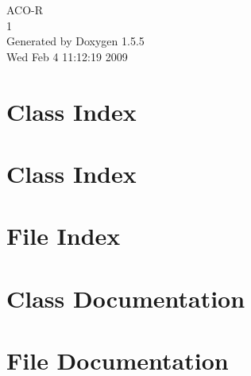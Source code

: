\documentclass[a4paper]{book}
\begin{document}
\begin{titlepage}
\vspace*{7cm}
\begin{center}
{\Large ACO-R \\[1ex]\large 1 }\\
\vspace*{1cm}
{\large Generated by Doxygen 1.5.5}\\
\vspace*{0.5cm}
{\small Wed Feb 4 11:12:19 2009}\\
\end{center}
\end{titlepage}
\clearemptydoublepage
{}
\tableofcontents
\clearemptydoublepage
{}
\chapter{Class Index}

\chapter{Class Index}

\chapter{File Index}

\chapter{Class Documentation}








\chapter{File Documentation}












\printindex
\end{document}
